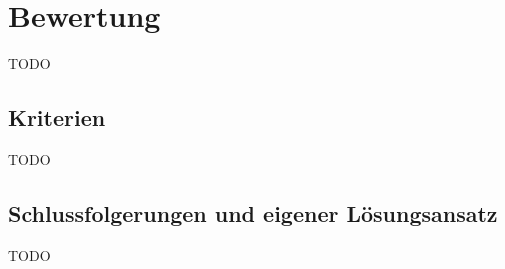 \section{Bewertung}
\label{sec:Bewertung}
TODO

\subsection{Kriterien}
\label{sub:Kriterien}
TODO

\subsection{Schlussfolgerungen und eigener Lösungsansatz}
\label{sub:Schlussfolgerungen und eigener Lösungsansatz}
TODO
